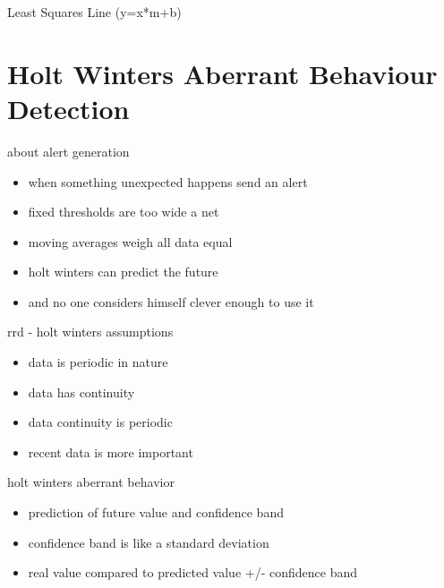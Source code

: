 \begin{frame}{Least Squares Line (y=x*m+b)}
\end{frame}


\section{Holt Winters Aberrant Behaviour Detection}

\begin{frame}{about alert generation}
\begin{itemize}
\item when something unexpected happens send an alert\pause
\item fixed thresholds are too wide a net\pause
\item moving averages weigh all data equal\pause
\item holt winters can predict the future\pause
\item and no one considers himself clever enough to use it
\end{itemize}
\end{frame}

\begin{frame}{rrd - holt winters assumptions}
\begin{itemize}
\item data is periodic in nature
\item data has continuity 
\item data continuity is periodic
\item recent data is more important
\end{itemize}
\end{frame}

\begin{frame}{holt winters aberrant behavior}
\begin{itemize}
\item prediction of future value and confidence band
\item confidence band is like a standard deviation
\item real value compared to predicted value +/- confidence band
\end{itemize}
\end{frame}


